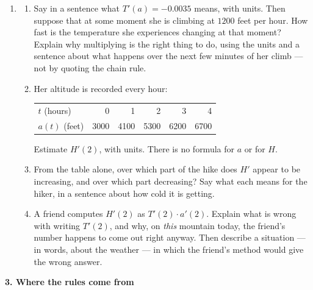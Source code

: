 \documentclass[11pt]{article}
\newcommand{\prob}[1]{\medskip\noindent\textbf{\large #1}\par\smallskip}
\begin{document}
\begin{enumerate}[resume]
\item[]
\begin{enumerate}
\item Say in a sentence what $T'(a) = -0.0035$ means, with units. Then suppose that at
some moment she is climbing at $1200$ feet per hour. How fast is the temperature she
experiences changing at that moment? Explain why multiplying is the right thing to do,
using the units and a sentence about what happens over the next few minutes of her
climb --- not by quoting the chain rule.

\item Her altitude is recorded every hour:

\smallskip
\begin{center}
\begin{tabular}{@{}lrrrrr@{}}
\toprule
$t$ (hours) & 0 & 1 & 2 & 3 & 4\\
$a(t)$ (feet) & 3000 & 4100 & 5300 & 6200 & 6700\\
\bottomrule
\end{tabular}
\end{center}
\smallskip

Estimate $H'(2)$, with units. There is no formula for $a$ or for $H$.

\item From the table alone, over which part of the hike does $H'$ appear to be
increasing, and over which part decreasing? Say what each means for the hiker, in a
sentence about how cold it is getting.

\item A friend computes $H'(2)$ as $T'(2)\cdot a'(2)$. Explain what is wrong with writing
$T'(2)$, and why, on \emph{this} mountain today, the friend's number happens to come out
right anyway. Then describe a situation --- in words, about the weather --- in which the
friend's method would give the wrong answer.
\end{enumerate}
\end{enumerate}

\prob{3. Where the rules come from}
\end{document}
